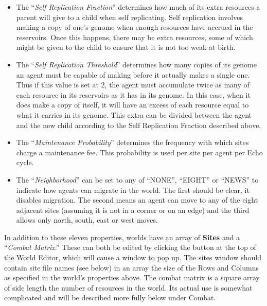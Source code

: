 \begin{itemize}
\item
The ``{\sl Self Replication Fraction}''  determines how much of its extra resources a parent will
give to a child when self replicating. Self replication involves
making a copy of one's genome when enough resources have accrued in
the reservoirs. Once this happens, there may be extra resources, some
of which might be given to the child to ensure that it is not too weak
at birth.

\item
The ``{\sl Self Replication Threshold}''  determines how many copies of its genome an agent must be
capable of making before it actually makes a single one. Thus if this
value is set at 2, the agent must accumulate twice as many of each
resource in its reservoirs as it has in its genome. In this case, when
it does make a copy of itself, it will have an excess of each resource
equal to what it carries in its genome.  This extra can be divided
between the agent and the new child according to the Self Replication
Fraction described above.

\item
The ``{\sl Maintenance Probability}'' 
 determines the frequency with
which sites charge a maintenance fee. This probability is used per
site per agent per Echo cycle.

\item
The ``{\sl Neighborhood}''   can
be set to any of ``NONE'', ``EIGHT'' or ``NEWS'' to indicate how
agents can migrate in the world. The first should be clear, it
disables migration. The second means an agent can move to any of the
eight adjacent sites (assuming it is not in a corner or on an edge)
and the third allows only north, south, east or west moves.

\end{itemize}

In addition to these eleven properties, worlds have an array of {\bf
Sites} and a ``{\sl Combat Matrix}.''  These can
both be edited by clicking the button at the top of the World Editor,
which will cause a window to pop up.  The sites window should contain
site file names (see below) in an array the size of the Rows and
Columns as specified in the world's properties above. The combat
matrix is a square array of side length the number of resources in the
world. Its actual use is somewhat complicated and will be described
more fully below under Combat.

